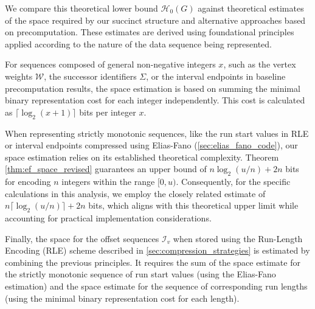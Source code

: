 We compare this theoretical lower bound $\mathcal{H}_0(G)$ against theoretical estimates of the space required by our succinct structure and alternative approaches based on precomputation. These estimates are derived using foundational principles applied according to the nature of the data sequence being represented.

For sequences composed of general non-negative integers $x$, such as the vertex weights $\mathcal{W}$, the successor identifiers $\Sigma$, or the interval endpoints in baseline precomputation results, the space estimation is based on summing the minimal binary representation cost for each integer independently. This cost is calculated as $\lceil \log_2(x+1) \rceil$ bits per integer $x$.

When representing strictly monotonic sequences, like the run start values in RLE or interval endpoints compressed using Elias-Fano (\autoref{sec:elias_fano_code}), our space estimation relies on its established theoretical complexity. Theorem \ref{thm:ef_space_revised} guarantees an upper bound of $n \log_2(u/n) + 2n$ bits for encoding $n$ integers within the range $[0, u)$. Consequently, for the specific calculations in this analysis, we employ the closely related estimate of $n \lceil \log_2(u/n) \rceil + 2n$ bits, which aligns with this theoretical upper limit while accounting for practical implementation considerations.

Finally, the space for the offset sequences $\mathcal{I}_v$ when stored using the Run-Length Encoding (RLE) scheme described in \autoref{sec:compression_strategies} is estimated by combining the previous principles. It requires the sum of the space estimate for the strictly monotonic sequence of run start values (using the Elias-Fano estimation) and the space estimate for the sequence of corresponding run lengths (using the minimal binary representation cost for each length).

